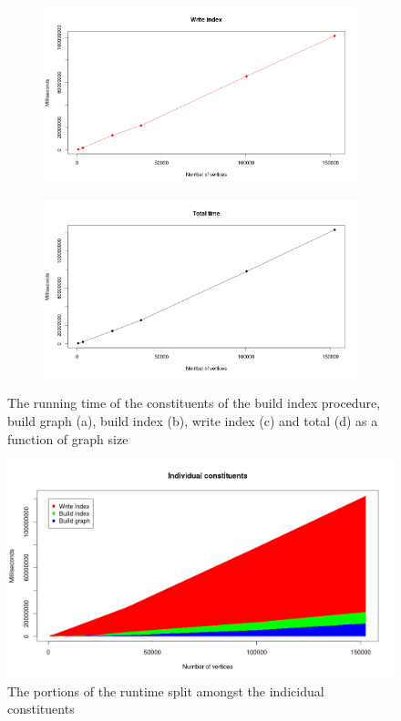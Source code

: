 \documentclass[thesis.tex]{subfiles}
\begin{document}
\begin{figure}
\begin{subfigure}[b]{0.5\textwidth}
    \includegraphics[width=\textwidth]{plots/build_index_write_index.png}
    \subcaption{}
  \end{subfigure}
  \begin{subfigure}[b]{0.49\textwidth}
    \includegraphics[width=\textwidth]{plots/build_index_total_time.png}
    \subcaption{}
  \end{subfigure}
  \caption{The running time of the constituents of the build index procedure, build graph (a), build index (b), write index (c) and total (d) as a function of graph size}
  \label{fig:build_index}
\end{figure}
\begin{figure}
  \includegraphics[width=\textwidth]{plots/build_index_constituents.png}
  \caption{The portions of the runtime split amongst the indicidual constituents}
  \label{fig:build_constituents}
\end{figure}
\end{document}
